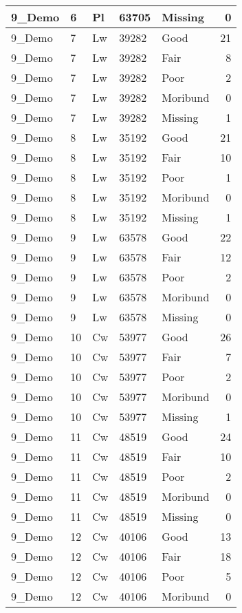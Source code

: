 \documentclass[
]{article}
\begin{document}
\begin{tabular}{l|l|l|l|l|r}
\hline
9\_Demo & 6 & Pl & 63705 & Missing & 0\\
\hline
9\_Demo & 7 & Lw & 39282 & Good & 21\\
\hline
9\_Demo & 7 & Lw & 39282 & Fair & 8\\
\hline
9\_Demo & 7 & Lw & 39282 & Poor & 2\\
\hline
9\_Demo & 7 & Lw & 39282 & Moribund & 0\\
\hline
9\_Demo & 7 & Lw & 39282 & Missing & 1\\
\hline
9\_Demo & 8 & Lw & 35192 & Good & 21\\
\hline
9\_Demo & 8 & Lw & 35192 & Fair & 10\\
\hline
9\_Demo & 8 & Lw & 35192 & Poor & 1\\
\hline
9\_Demo & 8 & Lw & 35192 & Moribund & 0\\
\hline
9\_Demo & 8 & Lw & 35192 & Missing & 1\\
\hline
9\_Demo & 9 & Lw & 63578 & Good & 22\\
\hline
9\_Demo & 9 & Lw & 63578 & Fair & 12\\
\hline
9\_Demo & 9 & Lw & 63578 & Poor & 2\\
\hline
9\_Demo & 9 & Lw & 63578 & Moribund & 0\\
\hline
9\_Demo & 9 & Lw & 63578 & Missing & 0\\
\hline
9\_Demo & 10 & Cw & 53977 & Good & 26\\
\hline
9\_Demo & 10 & Cw & 53977 & Fair & 7\\
\hline
9\_Demo & 10 & Cw & 53977 & Poor & 2\\
\hline
9\_Demo & 10 & Cw & 53977 & Moribund & 0\\
\hline
9\_Demo & 10 & Cw & 53977 & Missing & 1\\
\hline
9\_Demo & 11 & Cw & 48519 & Good & 24\\
\hline
9\_Demo & 11 & Cw & 48519 & Fair & 10\\
\hline
9\_Demo & 11 & Cw & 48519 & Poor & 2\\
\hline
9\_Demo & 11 & Cw & 48519 & Moribund & 0\\
\hline
9\_Demo & 11 & Cw & 48519 & Missing & 0\\
\hline
9\_Demo & 12 & Cw & 40106 & Good & 13\\
\hline
9\_Demo & 12 & Cw & 40106 & Fair & 18\\
\hline
9\_Demo & 12 & Cw & 40106 & Poor & 5\\
\hline
9\_Demo & 12 & Cw & 40106 & Moribund & 0\\

\end{tabular}
\end{document}
